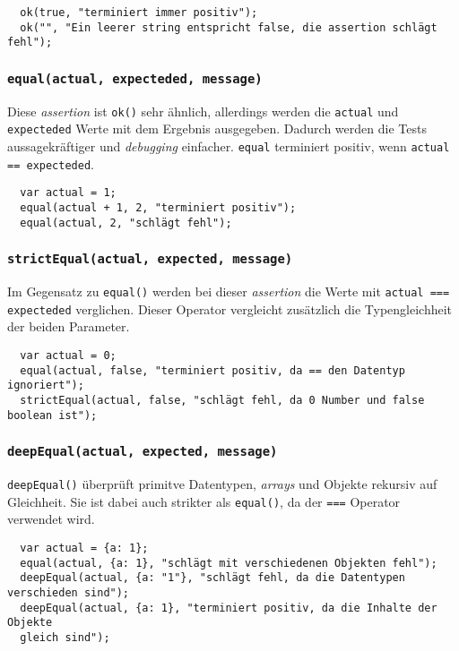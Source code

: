 \documentclass[11pt, a4paper]{article}
\begin{document}
\begin{verbatim}
  ok(true, "terminiert immer positiv");
  ok("", "Ein leerer string entspricht false, die assertion schlägt fehl");
\end{verbatim}

\subsubsection*{\texttt{equal(actual, expecteded, message)}}

Diese \emph{assertion} ist \texttt{ok()} sehr ähnlich, allerdings werden die
\texttt{actual} und \texttt{expecteded} Werte mit dem Ergebnis ausgegeben. Dadurch
werden die Tests aussagekräftiger und \emph{debugging} einfacher.
\texttt{equal} terminiert positiv, wenn \texttt{actual == expecteded}. 

\begin{verbatim}
  var actual = 1;
  equal(actual + 1, 2, "terminiert positiv");
  equal(actual, 2, "schlägt fehl");
\end{verbatim}

\subsubsection*{\texttt{strictEqual(actual, expected, message)}}

Im Gegensatz zu \texttt{equal()} werden bei dieser \emph{assertion} die Werte
mit \texttt{actual === expecteded} verglichen. Dieser Operator vergleicht
zusätzlich die Typengleichheit der beiden Parameter.

\begin{verbatim}
  var actual = 0;
  equal(actual, false, "terminiert positiv, da == den Datentyp ignoriert");
  strictEqual(actual, false, "schlägt fehl, da 0 Number und false boolean ist");
\end{verbatim}

\subsubsection*{\texttt{deepEqual(actual, expected, message)}}

\texttt{deepEqual()} überprüft primitve Datentypen, \emph{arrays} und Objekte
rekursiv auf Gleichheit. Sie ist dabei auch strikter als \texttt{equal()}, da
der \texttt{===} Operator verwendet wird.

\begin{verbatim}
  var actual = {a: 1};
  equal(actual, {a: 1}, "schlägt mit verschiedenen Objekten fehl");
  deepEqual(actual, {a: "1"}, "schlägt fehl, da die Datentypen verschieden sind");
  deepEqual(actual, {a: 1}, "terminiert positiv, da die Inhalte der Objekte
  gleich sind");
\end{verbatim}
\end{document}
